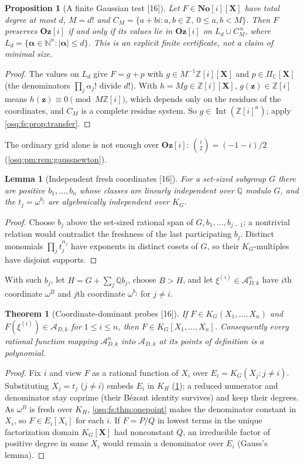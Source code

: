 \documentclass[11pt,letterpaper]{article}
\numberwithin{equation}{section}
\newtheorem{theorem}{Theorem}[section]
\newtheorem{lemma}[lemma]{Lemma}
\newtheorem{proposition}[proposition]{Proposition}
\theoremstyle{definition}
\theoremstyle{remark}
\theoremstyle{plain}
\newcommand{\No}{\mathbf{No}}
\newcommand{\Oz}{\mathbf{Oz}}
\newcommand{\SC}{\No[i]}
\newcommand{\GOz}{\Oz[i]}
\newcommand{\Z}{\mathbb Z}
\newcommand{\Q}{\mathbb Q}
\newcommand{\C}{\mathbb C}
\newcommand{\N}{\mathbb N}
\newcommand{\A}{\mathcal A}          %
\newcommand{\Int}{\operatorname{Int}}
\newcommand{\src}[1]{\textup{\textsf{[#1]}}}
\begin{document}
\begin{proposition}[A finite Gaussian test \src{16}]\label{osq:fs:prop:gausstest}
Let $F\in\SC[\mathbf X]$ have total degree at most $d$, $M=d!$ and $C_M=\{a+bi:a,b\in\Z,\ 0\le a,b<M\}$. Then $F$ preserves $\GOz$ if and
only if its values lie in $\GOz$ on $L_d\cup C_M^{\,n}$, where $L_d=\{\boldsymbol\alpha\in\N^n:|\boldsymbol\alpha|\le d\}$. This is an explicit
finite certificate, not a claim of minimal size.
\end{proposition}
\begin{proof}
The values on $L_d$ give $F=g+p$ with $g\in M^{-1}\Z[i][\mathbf X]$ and $p\in\Pi_\C[\mathbf X]$ (the denominators $\prod_j\alpha_j!$ divide $d!$).
With $h=Mg\in\Z[i][\mathbf X]$, $g(\mathbf z)\in\Z[i]$ means $h(\mathbf z)\equiv0\pmod{M\Z[i]}$, which depends only on the residues of the
coordinates, and $C_M$ is a complete residue system. So $g\in\Int(\Z[i]^n)$; apply \cref{osq:fs:prop:transfer}.
\end{proof}

The ordinary grid alone is not enough over $\GOz$: $\binom i2=(-1-i)/2$ (\cref{osq:pm:rem:gaussnewton}).

\begin{lemma}[Independent fresh coordinates \src{16}]\label{osq:fs:lem:independent}
For a set-sized subgroup $G$ there are positive $b_1,\dots,b_n$ whose classes are linearly independent over $\Q$ modulo $G$, and the
$t_j=\omega^{b_j}$ are algebraically independent over $K_G$.
\end{lemma}
\begin{proof}
Choose $b_j$ above the set-sized rational span of $G,b_1,\dots,b_{j-1}$; a nontrivial relation would contradict the freshness of the last
participating $b_j$. Distinct monomials $\prod_jt_j^{\alpha_j}$ have exponents in distinct cosets of $G$, so their $K_G$-multiples have disjoint
supports.
\end{proof}

With such $b_j$, let $H=G+\sum_j\Q b_j$, choose $B>H$, and let $\xi^{(i)}\in\A_{D,k}^n$ have $i$th coordinate $\omega^B$ and $j$th coordinate
$\omega^{b_j}$ for $j\ne i$.

\begin{theorem}[Coordinate-dominant probes \src{16}]\label{osq:fs:thm:probes}
If $F\in K_G(X_1,\dots,X_n)$ and $F(\xi^{(i)})\in\A_{D,k}$ for $1\le i\le n$, then $F\in K_G[X_1,\dots,X_n]$. Consequently every rational
function mapping $\A_{D,k}^n$ into $\A_{D,k}$ at its points of definition is a polynomial.
\end{theorem}
\begin{proof}
Fix $i$ and view $F$ as a rational function of $X_i$ over $E_i=K_G(X_j:j\ne i)$. Substituting $X_j=t_j$ ($j\ne i$) embeds $E_i$ in $K_H$
(\cref{osq:fs:lem:independent}); a reduced numerator and denominator stay coprime (their B\'ezout identity survives) and keep their degrees. As
$\omega^B$ is fresh over $K_H$, \cref{osq:fs:thm:onepoint} makes the denominator constant in $X_i$, so $F\in E_i[X_i]$ for each $i$. If $F=P/Q$ in
lowest terms in the unique factorization domain $K_G[\mathbf X]$ had nonconstant $Q$, an irreducible factor of positive degree in some $X_i$
would remain a denominator over $E_i$ (Gauss's lemma).
\end{proof}
\end{document}
